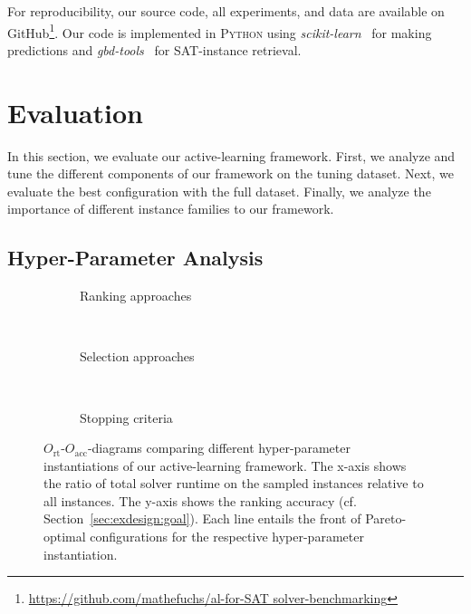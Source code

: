 \documentclass[runningheads]{llncs}
\begin{document}
For reproducibility, our source code, all experiments, and data are available on GitHub\footnote{\url{https://github.com/mathefuchs/al-for-SAT solver-benchmarking}}.
Our code is implemented in \textsc{Python} using \emph{scikit-learn}~\cite{scikit-learn} for making predictions and \emph{gbd-tools}~\cite{IserS18} for SAT-instance retrieval.


\section{Evaluation}
\label{sec:eval}

In this section, we evaluate our active-learning framework.
First, we analyze and tune the different components of our framework on the tuning dataset.
Next, we evaluate the best configuration with the full dataset.
Finally, we analyze the importance of different instance families to our framework.

\subsection{Hyper-Parameter Analysis}

\begin{figure}[tbp!]
	\centering
	\begin{subfigure}{1.0\textwidth}
		\caption{Ranking approaches}
		\label{fig:annitraincolorranking}
	\end{subfigure}
	\\
	\vspace{0.2cm}
	\begin{subfigure}{1.0\textwidth}
		\caption{Selection approaches}
		\label{fig:annitraincolorselection}
	\end{subfigure}
	\\
	\vspace{0.2cm}
	\begin{subfigure}{1.0\textwidth}
		\caption{Stopping criteria}
		\label{fig:annitraincolorstopping}
	\end{subfigure}
	\caption{
		$O_{\operatorname{rt}}$-$O_{\operatorname{acc}}$-diagrams comparing different hyper-parameter instantiations of our active-learning framework.
		The x-axis shows the ratio of total solver runtime on the sampled instances relative to all instances.
		The y-axis shows the ranking accuracy (cf. Section~\ref{sec:exdesign:goal}).
		Each line entails the front of Pareto-optimal configurations for the respective hyper-parameter instantiation.
	}
	\label{fig:e2eallsolvers}
\end{figure}
\end{document}
